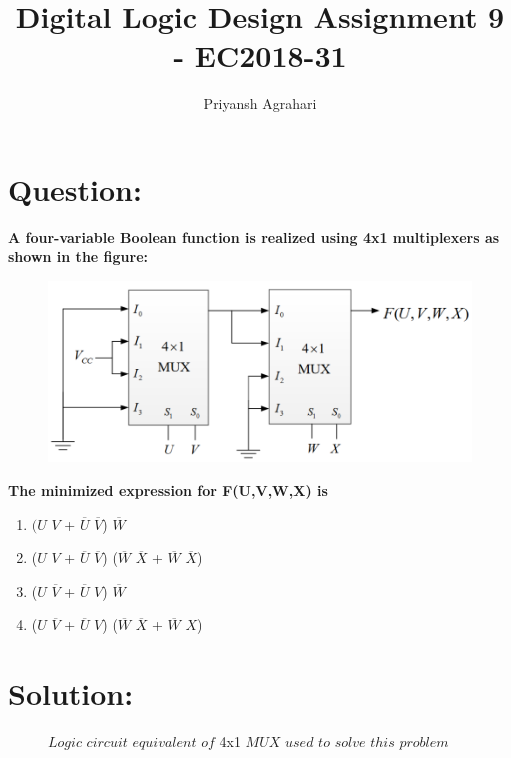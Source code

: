 \documentclass{article}
\title{Digital Logic Design Assignment 9 - EC2018-31}
\author{Priyansh Agrahari}
\begin{document}
\maketitle

\section{Question:}

\textbf{A four-variable Boolean function is realized using 4x1 multiplexers as shown in the figure:}

\vspace{1cm}

\begin{figure}[h]
\centering
\includegraphics[scale=0.3]{images/MUX_fig.png}
\end{figure}

\vspace{1cm}

\textbf{The minimized expression for F(U,V,W,X) is}

\begin{enumerate}[label=(\Alph*)]
\item $(U$ $V$ + $\overline{U}$  $\overline{V}$) $\overline{W}$
\item ($U$ $V$ + $\overline{U}$ $\overline{V}$) ($\overline{W}$  $\overline{X}$ + $\overline{W}$ $\overline{X}$)
\item ($U$ $\overline{V}$ + $\overline{U}$ $V$) $\overline{W}$
\item ($U$ $\overline{V}$ + $\overline{U}$ $V$) ($\overline{W}$ $\overline{X}$ + $\overline{W}$ $X$)
\end{enumerate}

\pagebreak{}

\section{Solution:}

\begin{figure}[!ht]
\centering
\resizebox{\columnwidth}{!} {

}
\caption{$Logic$ $circuit$ $equivalent$ $of$ 4x1 $MUX$ $used$ $to$ $solve$ $this$ $problem$}
\label{mux1}
\end{figure}
\end{document}
